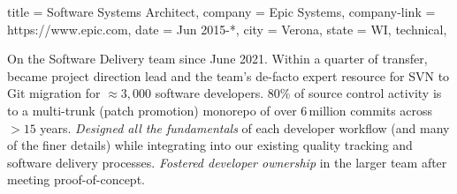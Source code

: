\begin{position}
  {
    title   = Software Systems Architect,
    company = Epic Systems,
    company-link = https://www.epic.com,
    date    = Jun 2015-*,
    city    = Verona,
    state   = WI,
    technical,
  }

  On the Software Delivery team since June 2021. Within a quarter of
  transfer, became project direction lead and the team's de-facto
  expert resource for SVN to Git migration for $\approx 3,000$
  software developers. 80\% of source control activity is to a
  multi-trunk (patch promotion) monorepo of over 6\,million commits
  across $>15$ years.
  \emph{Designed all the fundamentals} of each developer workflow (and
  many of the finer details) while integrating into our existing
  quality tracking and software delivery processes. \emph{Fostered
    developer ownership} in the larger team after meeting
  proof-of-concept.

  \medskip


\end{position}
